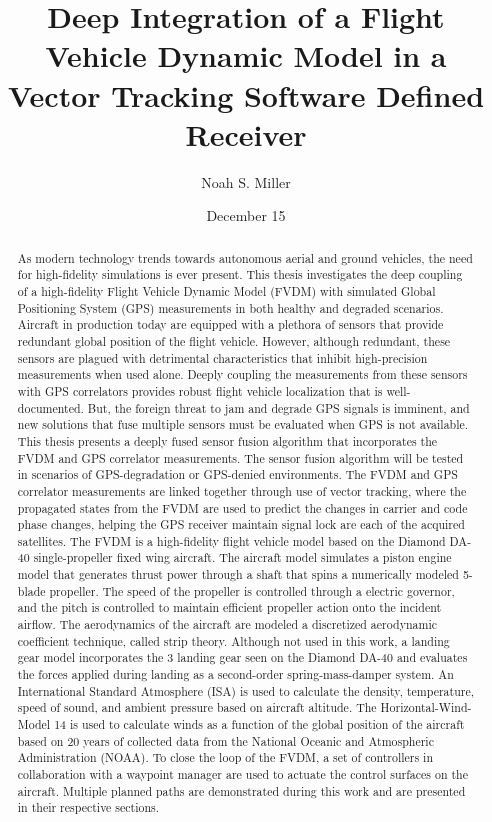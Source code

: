 \documentclass[12pt]{report}
\title{Deep Integration of a Flight Vehicle Dynamic Model in a Vector Tracking Software Defined Receiver}
\author{Noah S. Miller}
\date{December 15}
\begin{document}
\begin{romanpages}      %

  \TitlePage{}
  \begin{abstract}
    As modern technology trends towards autonomous aerial and ground vehicles, the need for high-fidelity simulations is ever present. This thesis investigates the deep coupling of a high-fidelity Flight Vehicle Dynamic Model (FVDM) with simulated Global Positioning System (GPS) measurements in both healthy and degraded scenarios.
    Aircraft in production today are equipped with a plethora of sensors that provide redundant global position of the flight vehicle. However, although redundant, these sensors are plagued with detrimental characteristics that inhibit high-precision measurements when used alone. Deeply coupling the measurements from these sensors with GPS correlators provides robust flight vehicle localization that is well-documented. But, the foreign threat to jam and degrade GPS signals is imminent, and new solutions that fuse multiple sensors must be evaluated when GPS is not available.
    This thesis presents a deeply fused sensor fusion algorithm that incorporates the FVDM and GPS correlator measurements. The sensor fusion algorithm will be tested in scenarios of GPS-degradation or GPS-denied environments. The FVDM and GPS correlator measurements are linked together through use of vector tracking, where the propagated states from the FVDM are used to predict the changes in carrier and code phase changes, helping the GPS receiver maintain signal lock are each of the acquired satellites.
    The FVDM is a high-fidelity flight vehicle model based on the Diamond DA-40 single-propeller fixed wing aircraft. The aircraft model simulates a piston engine model that generates thrust power through a shaft that spins a numerically modeled 5-blade propeller. The speed of the propeller is controlled through a electric governor, and the pitch is controlled to maintain efficient propeller action onto the incident airflow. The aerodynamics of the aircraft are modeled a discretized aerodynamic coefficient technique, called strip theory. Although not used in this work, a landing gear model incorporates the 3 landing gear seen on the Diamond DA-40 and evaluates the forces applied during landing as a second-order spring-mass-damper system. An International Standard Atmosphere (ISA) is used to calculate the density, temperature, speed of sound, and ambient pressure based on aircraft altitude. The Horizontal-Wind-Model 14 is used to calculate winds as a function of the global position of the aircraft based on 20 years of collected data from the National Oceanic and Atmospheric Administration (NOAA). To close the loop of the FVDM, a set of controllers in collaboration with a waypoint manager are used to actuate the control surfaces on the aircraft. Multiple planned paths are demonstrated during this work and are presented in their respective sections.

\end{abstract}
\end{romanpages}
\end{document}
